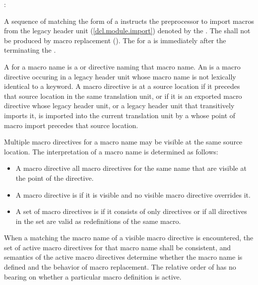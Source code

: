 \begin{after}
\begin{std.txt}
\begin{bnf}
:\br
\end{bnf}

\color{addclr}
\alinea
A sequence of  matching the form
of a 
instructs the preprocessor to import macros from the legacy header unit
(\ref{dcl.module.import}) denoted by the .
The \tcode{;}  shall not be produced by
macro replacement ().
The  for a  is
immediately after the \tcode{;} terminating the .

\color{addclr}
\alinea
A  for a macro name is a  or
 directive naming that macro name.
An  is
a macro directive occuring in a legacy header unit
\color{addclr}
whose macro name is not lexically identical to a keyword.
A macro directive is  at a source location
if it precedes that source location in the same translation unit, or
if it is an exported macro directive whose legacy header unit,
or a legacy header unit that
\color{addclr}
transitively imports it,
is imported into the current translation unit by a 
whose point of macro import precedes that source location.

\alinea
Multiple macro directives for a macro name may be visible at the same
source location.
The interpretation of a macro name is determined as follows:
\begin{itemize}
\item
\color{addclr}
A macro directive  all macro directives for the same name
that are visible at the point of the directive.
\item
\color{addclr}
A macro directive is  if it is visible and
no visible macro directive overrides it.
\item
\color{addclr}
A set of macro directives is  if it consists of only
 directives or if all  directives in the set
are valid as redefinitions of the same macro.
\end{itemize}
\color{addclr}
When a  matching the macro name of a visible
macro directive is encountered, the set of active macro directives for that
macro name shall be consistent, and semantics of the active macro directives
determine whether the macro name is defined and the behavior of macro
replacement.
\enternote
The relative order of  has no bearing on whether a
particular macro definition is active.
\exitnote
\end{std.txt}
\end{after}

